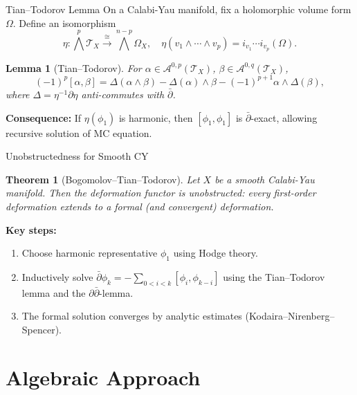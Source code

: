 \documentclass{beamer}
\theoremstyle{definition}
\theoremstyle{plain}
\newtheorem{thm}[defn]{Theorem}
\newtheorem{lem}[defn]{Lemma}
\begin{document}
\begin{frame}{Tian–Todorov Lemma}
    On a Calabi-Yau manifold, fix a holomorphic volume form $\Omega$. Define an isomorphism
    \[
    \eta: \bigwedge^p \mathcal{T}_X \xrightarrow{\cong} \bigwedge^{n-p}\Omega_X,\quad
    \eta(v_1\wedge\cdots\wedge v_p) = i_{v_1}\cdots i_{v_p}(\Omega).
    \]
    \begin{lem}[Tian–Todorov]
        For $\alpha\in\mathcal{A}^{0,p}(\mathcal{T}_X)$, $\beta\in\mathcal{A}^{0,q}(\mathcal{T}_X)$,
        \[
        (-1)^p[\alpha,\beta] = \Delta(\alpha\wedge\beta) - \Delta(\alpha)\wedge\beta - (-1)^{p+1}\alpha\wedge\Delta(\beta),
        \]
        where $\Delta = \eta^{-1}\partial\eta$ anti-commutes with $\bar\partial$.
    \end{lem}
    \pause
    \textbf{Consequence:} If $\eta(\phi_1)$ is harmonic, then $[\phi_1,\phi_1]$ is $\bar\partial$-exact, allowing recursive solution of MC equation.
\end{frame}

\begin{frame}{Unobstructedness for Smooth CY}
    \begin{thm}[Bogomolov–Tian–Todorov]
        Let $X$ be a smooth Calabi-Yau manifold. Then the deformation functor is unobstructed: every first-order deformation extends to a formal (and convergent) deformation.
    \end{thm}
    \pause
    \textbf{Key steps:}
    \begin{enumerate}
        \item Choose harmonic representative $\phi_1$ using Hodge theory.
        \item Inductively solve $\bar\partial\phi_k = -\sum_{0<i<k}[\phi_i,\phi_{k-i}]$ using the Tian–Todorov lemma and the $\partial\bar\partial$-lemma.
        \item The formal solution converges by analytic estimates (Kodaira–Nirenberg–Spencer).
    \end{enumerate}
\end{frame}

\section{Algebraic Approach}
\end{document}
